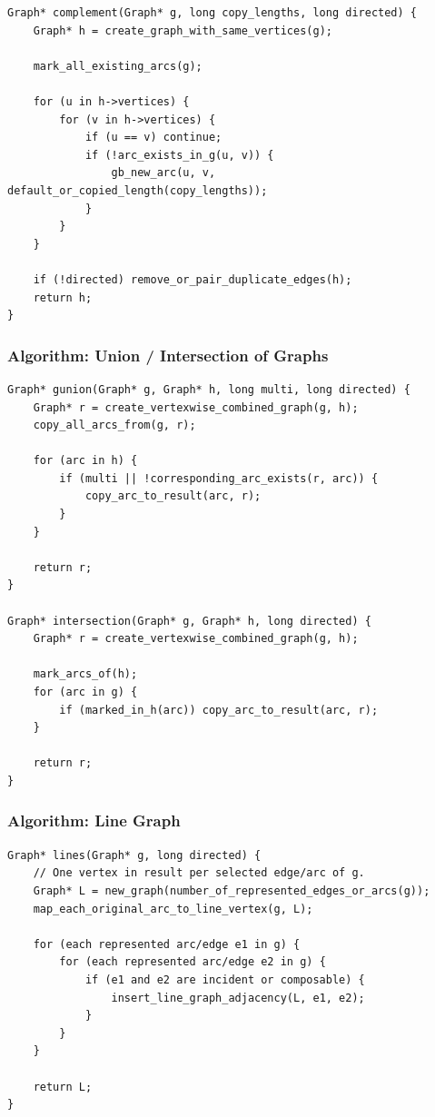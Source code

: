 \documentclass[11pt]{article}
\begin{document}
\begin{verbatim}
Graph* complement(Graph* g, long copy_lengths, long directed) {
    Graph* h = create_graph_with_same_vertices(g);

    mark_all_existing_arcs(g);

    for (u in h->vertices) {
        for (v in h->vertices) {
            if (u == v) continue;
            if (!arc_exists_in_g(u, v)) {
                gb_new_arc(u, v, default_or_copied_length(copy_lengths));
            }
        }
    }

    if (!directed) remove_or_pair_duplicate_edges(h);
    return h;
}
\end{verbatim}

\subsubsection{Algorithm: Union / Intersection of Graphs}\label{algorithm-union-intersection-of-graphs}

\begin{verbatim}
Graph* gunion(Graph* g, Graph* h, long multi, long directed) {
    Graph* r = create_vertexwise_combined_graph(g, h);
    copy_all_arcs_from(g, r);

    for (arc in h) {
        if (multi || !corresponding_arc_exists(r, arc)) {
            copy_arc_to_result(arc, r);
        }
    }

    return r;
}

Graph* intersection(Graph* g, Graph* h, long directed) {
    Graph* r = create_vertexwise_combined_graph(g, h);

    mark_arcs_of(h);
    for (arc in g) {
        if (marked_in_h(arc)) copy_arc_to_result(arc, r);
    }

    return r;
}
\end{verbatim}

\subsubsection{Algorithm: Line Graph}\label{algorithm-line-graph}

\begin{verbatim}
Graph* lines(Graph* g, long directed) {
    // One vertex in result per selected edge/arc of g.
    Graph* L = new_graph(number_of_represented_edges_or_arcs(g));
    map_each_original_arc_to_line_vertex(g, L);

    for (each represented arc/edge e1 in g) {
        for (each represented arc/edge e2 in g) {
            if (e1 and e2 are incident or composable) {
                insert_line_graph_adjacency(L, e1, e2);
            }
        }
    }

    return L;
}
\end{verbatim}
\end{document}
